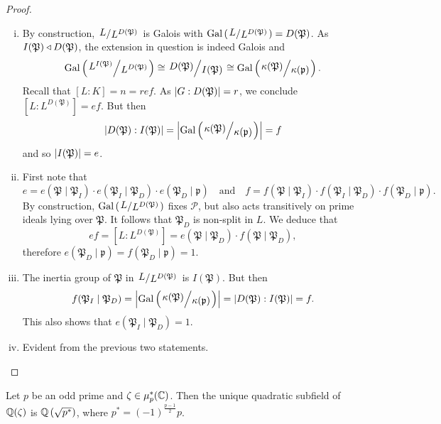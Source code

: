 \begin{proof}
\phantom{i}
\begin{enumerate}[i)]
\item By construction, $\kvoc{L}{L^{D(\mathfrak{P})}}$ is Galois
with $\Gal \br{\kvoc{L}{L^{D(\mathfrak{P})}}} = D(\mathfrak{P})$.
As $I(\mathfrak{P}) \triangleleft D(\mathfrak{P})$, the extension in
question is indeed Galois and
\[
\Gal \br{\kvoc{L^{I(\mathfrak{P})}}{L^{D(\mathfrak{P})}}} \cong
\kvoc{D(\mathfrak{P})}{I(\mathfrak{P})} \cong
\Gal \br{\kvoc{\kappa(\mathfrak{P})}{\kappa(\mathfrak{p})}}.
\]
Recall that $[L : K] = n = ref$. As
$\left\lvert G : D(\mathfrak{P})\right\rvert = r$, we conclude
$\left[L : L^{D(\mathfrak{P})}\right] = ef$. But then
\[
\abs{D(\mathfrak{P}) : I(\mathfrak{P})} =
\abs{\Gal \br{\kvoc{\kappa(\mathfrak{P})}{\kappa(\mathfrak{p})}}} =
f
\]
and so $\left\lvert I(\mathfrak{P})\right\rvert = e$.
\item First note that
\[
e =
e(\mathfrak{P} \mid \mathfrak{P}_I) \cdot
e(\mathfrak{P}_I \mid \mathfrak{P}_D) \cdot
e(\mathfrak{P}_D \mid \mathfrak{p})
\quad \text{and} \quad
f =
f(\mathfrak{P} \mid \mathfrak{P}_I) \cdot
f(\mathfrak{P}_I \mid \mathfrak{P}_D) \cdot
f(\mathfrak{P}_D \mid \mathfrak{p}).
\]
By construction, $\Gal \br{\kvoc{L}{L^{D(\mathfrak{P})}}}$ fixes
$\mathcal{P}$, but also acts transitively on prime ideals lying
over $\mathfrak{P}$. It follows that $\mathfrak{P}_D$ is non-split
in $L$. We deduce that
\[
ef =
\left[L : L^{D(\mathfrak{P})}\right] =
e(\mathfrak{P} \mid \mathfrak{P}_D) \cdot
f(\mathfrak{P} \mid \mathfrak{P}_D),
\]
therefore
$e(\mathfrak{P}_D \mid \mathfrak{p}) =
f(\mathfrak{P}_D \mid \mathfrak{p}) = 1$.
\item The inertia group of $\mathfrak{P}$ in
$\kvoc{L}{L^{D(\mathfrak{P})}}$ is $I(\mathfrak{P})$. But then
\[
f(\mathfrak{P}_I \mid \mathfrak{P}_D) =
\abs{\Gal \br{\kvoc{\kappa(\mathfrak{P})}{\kappa(\mathfrak{p})}}} =
\abs{D(\mathfrak{P}) : I(\mathfrak{P})} =
f.
\]
This also shows that $e(\mathfrak{P}_I \mid \mathfrak{P}_D) = 1$.
\item Evident from the previous two statements. \qedhere
\end{enumerate}
\end{proof}


\begin{lema}
Let $p$ be an odd prime and $\zeta \in \mu_p^*(\mathbb{C})$. Then the
unique quadratic subfield of $\mathbb{Q}(\zeta)$ is
$\mathbb{Q} \left(\sqrt{p^*}\right)$, where $p^* = (-1)^{\frac{p-1}{2}} p$.
\end{lema}

